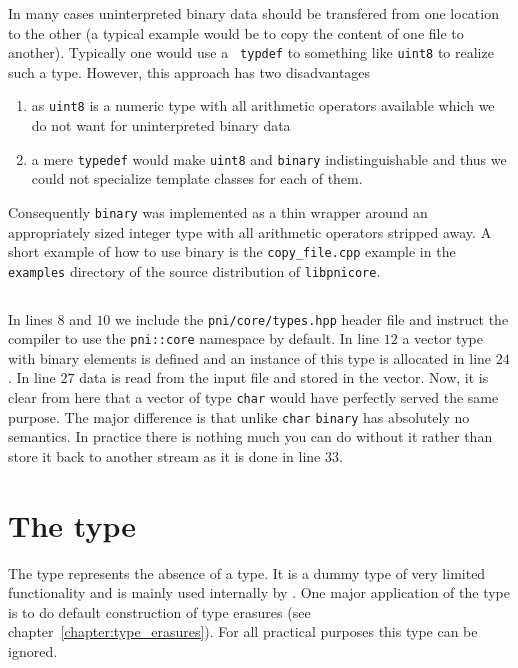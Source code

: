 In many cases uninterpreted binary data should be transfered from one location
to the other (a typical example would be to copy the content of one file to
another).
Typically one would use a \texttt{ typdef} to something like \texttt{uint8} to realize
such a type. However, this approach has two disadvantages
\begin{enumerate}
\item as \texttt{uint8} is a numeric type with all arithmetic operators available
which we do not want for uninterpreted binary data 
\item a mere \texttt{typedef} would make \texttt{uint8} and \texttt{binary} 
indistinguishable and thus we could not specialize template classes for each of
them.
\end{enumerate}
Consequently \texttt{binary} was implemented as a thin wrapper around an
appropriately sized integer type with all arithmetic operators stripped away.
A short example of how to use binary is the \texttt{copy\_file.cpp} example in the
\texttt{examples} directory of the source distribution of \texttt{libpnicore}. 

\inputminted[linenos,
             firstline=24,
             frame=lines,
             label=examples/copy\_file.cpp]
{cpp}{../examples/copy_file.cpp}

In lines $8$ and $10$ we include the \texttt{pni/core/types.hpp} header file and
instruct the compiler to use the \texttt{pni::core} namespace by default. In line
$12$ a vector type with binary elements is defined and an instance of this type
is allocated in line $24$. 
In line $27$ data is read from the input file and stored in the vector. Now, it
is clear from here that a vector of type  \texttt{char} would have perfectly served
the same purpose. The major difference is that unlike \texttt{char} \texttt{binary}
has absolutely no semantics. In practice there is nothing much you can do
without it rather than store it back to another stream as it is done in 
line $33$.

\section{The  type}\label{section:using_none}

The  type represents the absence of a type. It is a dummy type 
of very limited functionality and is mainly used internally by 
\libpnicore. One major application of the  type is to do default
construction of type erasures (see chapter~\ref{chapter:type_erasures}). 
For all practical purposes this type can be ignored.

